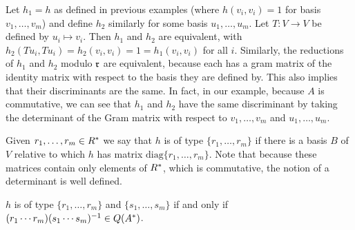 \begin{example}
Let $h_1 = h$ as defined in previous examples (where $h(v_i, v_i) = 1$ for basis $v_1, \dotsc, v_m$) and define $h_2$ similarly for some basis $u_1, \dotsc, u_m$.
Let $T: V \to V$ be defined by $u_i \mapsto v_i$.
Then $h_1$ and $h_2$ are equivalent, with $h_2(Tu_i, Tu_i) = h_2(v_i, v_i) = 1 = h_1(v_i, v_i)$ for all $i$.
Similarly, the reductions of $h_1$ and $h_2$ modulo $\mathfrak{r}$ are equivalent, because each has a gram matrix of the identity matrix with respect to the basis they are defined by.
This also implies that their discriminants are the same.
In fact, in our example, because $A$ is commutative, we can see that $h_1$ and $h_2$ have the same discriminant by taking the determinant of the Gram matrix with respect to $v_1, \dotsc, v_m$ and $u_1, \dotsc, u_m$.
\end{example}

Given $r_1, \dotsc, r_m \in R^*$ we say that $h$ is of type $\{r_1, \dotsc, r_m \}$ if there is a basis $B$ of $V$ relative to which $h$ has matrix $\text{diag} \{r_1, \dotsc, r_m \}$.
Note that because these matrices contain only elements of $R^*$, which is commutative, the notion of a determinant is well defined.

\begin{lemma}\label{extralemma1}
$h$ is of type $\{r_1, \dotsc, r_m \}$ and $\{s_1, \dotsc, s_m \}$ if and only if \newline $(r_1 \dotsb r_m)(s_1 \dotsb s_m)^{-1} \in Q(A^*)$.
\end{lemma}

